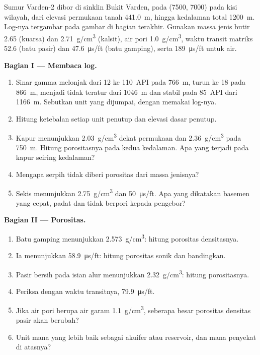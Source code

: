 \begin{problem}
\label{pb:b3:facies-models:1}
Sumur Varden-2 dibor di sinklin Bukit Varden, pada
(7500, 7000) pada kisi wilayah, dari elevasi permukaan tanah
\qty{441.0}{m}, hingga kedalaman total \qty{1200}{m}. Log-nya tergambar pada
gambar di bagian terakhir. Gunakan massa jenis butir 2.65 (kuarsa) dan
\qty{2.71}{g/cm^3} (kalsit), air pori \qty{1.0}{g/cm^3}, waktu transit matriks
52.6 (batu pasir) dan \qty{47.6}{\micro\second/ft}
(batu gamping), serta \qty{189}{\micro\second/ft} untuk air.

\medskip\noindent\textbf{Bagian I --- Membaca log.}
\begin{enumerate}
\item Sinar gamma melonjak dari 12 ke \qty{110}{API} pada \qty{766}{m}, turun
  ke 18 pada \qty{866}{m}, menjadi tidak teratur dari \qty{1046}{m} dan stabil pada
  \qty{85}{API} dari \qty{1166}{m}. Sebutkan unit yang dijumpai, dengan memakai log-nya.
\item Hitung ketebalan setiap unit penutup dan elevasi
  dasar penutup.
\item Kapur menunjukkan \qty{2.03}{g/cm^3} dekat permukaan dan
  \qty{2.36}{g/cm^3} pada \qty{750}{m}. Hitung porositasnya pada kedua kedalaman.
  Apa yang terjadi pada kapur seiring kedalaman?
\item Mengapa serpih tidak diberi porositas dari massa jenisnya?
\item Sekis menunjukkan \qty{2.75}{g/cm^3} dan \qty{50}{\micro\second/ft}.
  Apa yang dikatakan basemen yang cepat, padat dan tidak berpori kepada pengebor?
\end{enumerate}

\medskip\noindent\textbf{Bagian II --- Porositas.}
\begin{enumerate}[resume]
\item Batu gamping menunjukkan \qty{2.573}{g/cm^3}: hitung porositas densitasnya.
\item Ia menunjukkan \qty{58.9}{\micro\second/ft}: hitung porositas sonik dan
  bandingkan.
\item Pasir bersih pada isian alur menunjukkan \qty{2.32}{g/cm^3}: hitung
  porositasnya.
\item Periksa dengan waktu transitnya, \qty{79.9}{\micro\second/ft}.
\item Jika air pori berupa air garam \qty{1.1}{g/cm^3}, seberapa besar
  porositas densitas pasir akan berubah?
\item Unit mana yang lebih baik sebagai akuifer atau reservoir, dan
  mana penyekat di atasnya?
\end{enumerate}


\end{problem}
